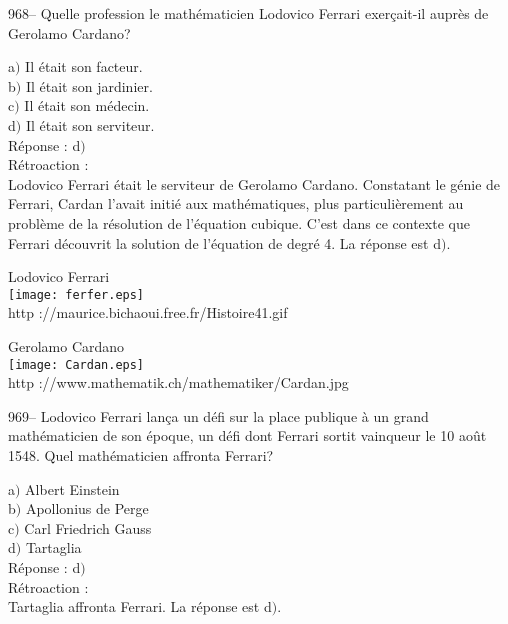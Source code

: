 ﻿\documentclass[letterpaper, 12pt]{article}
\begin{document}
968-- Quelle profession le math\'ematicien Lodovico Ferrari exer\c
cait-il aupr\`es de Gerolamo Cardano?

a$)$ Il \'etait son facteur. \\
b$)$ Il \'etait son jardinier.  \\
c$)$ Il \'etait son m\'edecin. \\
d$)$ Il \'etait son serviteur. \\

R\'eponse : d$)$\\

R\'etroaction : \\
Lodovico Ferrari \'etait le serviteur de Gerolamo Cardano.
Constatant le g\'enie de Ferrari, Cardan l'avait initi\'e aux
math\'emati\-ques, plus particuli\`erement au probl\`eme de la
r\'esolution de l'\'equation
cubique. C'est dans ce contexte que Ferrari d\'ecouvrit la solution de
l'\'equation de degr\'e 4. La r\'eponse est d$)$.\\

        \begin{center}
        Lodovico Ferrari\\
    \texttt{[image: ferfer.eps]}\\
        {\footnotesize http ://maurice.bichaoui.free.fr/Histoire41.gif}
    \end{center}

        \begin{center}
        Gerolamo Cardano\\
    \texttt{[image: Cardan.eps]}\\
        {\footnotesize http ://www.mathematik.ch/mathematiker/Cardan.jpg}
    \end{center}

969-- Lodovico Ferrari lan\c ca un d\'efi sur la place publique \`a
un grand math\'ematicien de son \'epoque, un d\'efi dont Ferrari
sortit vainqueur le 10 ao\^ut 1548. Quel math\'ematicien affronta
Ferrari?

a$)$ Albert Einstein \\
b$)$ Apollonius de Perge  \\
c$)$ Carl Friedrich Gauss \\
d$)$ Tartaglia\\

R\'eponse : d$)$\\

R\'etroaction :\\
Tartaglia affronta Ferrari. La r\'eponse est d$)$.\\
\end{document}
